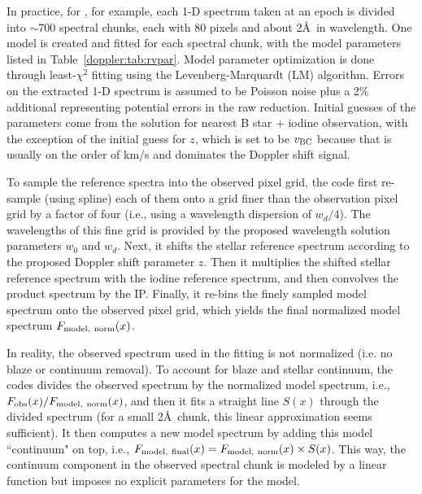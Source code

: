 In practice, for \keck, for example, each 1-D spectrum taken at an
epoch is divided into $\sim$700 spectral chunks, each with 80 pixels
and about 2\AA\ in wavelength. One model is created and fitted for
each spectral chunk, with the model parameters listed in
Table~\ref{doppler:tab:rvpar}. Model parameter optimization is done
through least-$\chi^2$ fitting using the Levenberg-Marquardt (LM)
algorithm. Errors on the extracted 1-D spectrum is assumed to be
Poisson noise plus a 2\% additional representing potential errors in
the raw reduction. Initial guesses of the parameters come from the
solution for nearest B star $+$ iodine observation, with the exception
of the initial guess for $z$, which is set to be $v_{\rm BC}$ because
that is usually on the order of km/s and dominates the Doppler shift signal.

To sample the reference spectra into the observed pixel grid, the code
first re-sample (using spline) each of them onto a grid finer than the
observation pixel grid by a factor of four (i.e., using a wavelength
dispersion of $w_d/4$). The wavelengths of this fine grid is provided
by the proposed wavelength solution parameters $w_0$ and $w_d$. Next,
it shifts the stellar reference spectrum according to the proposed
Doppler shift parameter $z$. Then it multiplies the shifted stellar
reference spectrum with the iodine reference spectrum, and then
convolves the product spectrum by the IP. Finally, it re-bins the
finely sampled model spectrum onto the observed pixel grid, which
yields the final normalized model spectrum $F_{\rm model,\ norm}(x)$.

In reality, the observed spectrum used in the fitting is not
normalized (i.e. no blaze or continuum removal). To account for blaze
and stellar continuum, the codes divides the observed spectrum by the
normalized model spectrum, i.e., $F_{\rm obs}(x)/F_{\rm model,\
  norm}(x)$, and then it fits a straight line $S(x)$ through the
divided spectrum (for a small 2\AA\ chunk, this linear approximation
seems sufficient). It then computes a new model spectrum by adding
this model ``continuum" on top, i.e., $F_{\rm model,\ final}(x) =
F_{\rm model,\ norm}(x) \times S(x)$. This way, the continuum component
in the observed spectral chunk is modeled by a linear function but
imposes no explicit parameters for the model.



